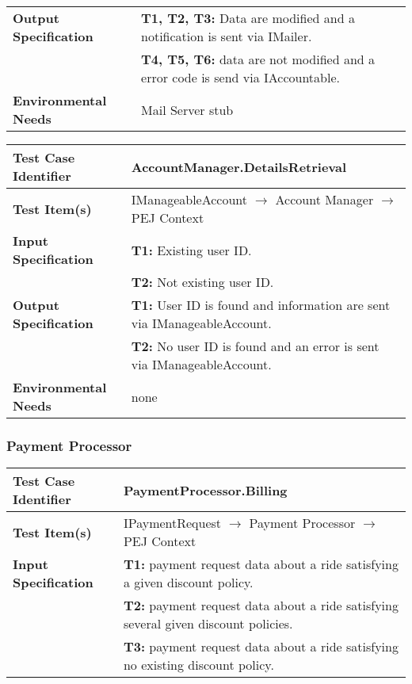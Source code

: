 {\begin{tabularx}{\textwidth}{l X}
    \textbf{Output Specification} & \textbf{T1, T2, T3:} Data are modified and a notification is sent via IMailer.\\
                                & \textbf{T4, T5, T6:} data are not modified and a error code is send via IAccountable.\\
    \hline 
    
    \textbf{Environmental Needs} & Mail Server stub\\
    \hline
\end{tabularx}
\bigskip 

\noindent
\begin{tabularx}{\textwidth}{l X}
    \hline 
    \textbf{Test Case Identifier} & AccountManager.DetailsRetrieval\\ 
    \hline 
    
    \textbf{Test Item(s)} & IManageableAccount $\rightarrow$ Account Manager $\rightarrow$ PEJ Context\\
    \hline 
    
    \textbf{Input Specification} & \textbf{T1:} Existing user ID. \\
                                & \textbf{T2:} Not existing user ID.\\
    \hline  
    
    \textbf{Output Specification} & \textbf{T1:} User ID is found and information are sent via IManageableAccount.\\
                                & \textbf{T2:} No user ID is found and an error is sent via IManageableAccount.\\
    \hline 
    
    
    \textbf{Environmental Needs} & none\\
    \hline
\end{tabularx}

\subsubsection{Payment Processor}
\begin{tabularx}{\textwidth}{l X}
    \hline 
    \textbf{Test Case Identifier} & PaymentProcessor.Billing\\ 
    \hline 
    
    \textbf{Test Item(s)} & IPaymentRequest $\rightarrow$ Payment Processor $\rightarrow$ PEJ Context\\
    \hline 
    
    \textbf{Input Specification} & \textbf{T1:} payment request data about a ride satisfying a given discount policy.\\
                                & \textbf{T2:} payment request data about a ride satisfying several given discount policies.\\
                                &  \textbf{T3:} payment request data about a ride satisfying no existing discount policy.\\
    \hline 
    

\end{tabularx}}

